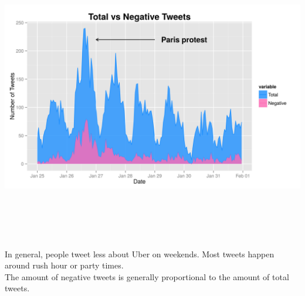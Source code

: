 \documentclass[a222,landscape]{a0poster}
\begin{document}
\begin{multicols}{4}
\begin{center}
\includegraphics[width=\linewidth, height=5in]{../figures/Poster_TotalNegTweets.png}

\end{center}\vspace{0.25 cm}

In general, people tweet less about Uber on weekends. Most tweets happen around rush hour or party times. \\
The amount of negative tweets is generally proportional to the amount of total tweets.

\begin{center}\vspace{0.5 cm}


\end{center}
\end{multicols}
\end{document}

